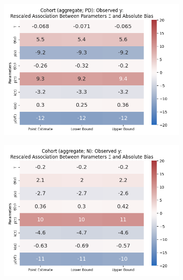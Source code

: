 \documentclass[12pt]{article}
\begin{document}
\begin{figure}[H]
\begin{subfigure}[t]{0.23\linewidth}
		\includegraphics[scale=0.25]{VEMethod_Drivers1b_FEest_Realistic_Li_MSpec_Heatmap7.png}
	\end{subfigure}
	\begin{subfigure}[t]{0.23\linewidth}
		\centering
		\caption{}
		\includegraphics[scale=0.25]{VEMethod_Drivers1b_FEest_Realistic_Li_MSpec_Heatmap8.png}
	\end{subfigure}
	

\end{figure}
\end{document}
